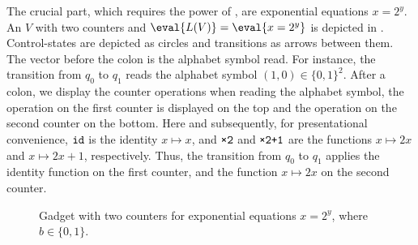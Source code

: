 The crucial part, which requires the power of \laVASS, are exponential
equations $x=2^y$. An \laVASS $V$ with two counters and
$\eval{L(V)}=\eval{x=2^y}$ is depicted
in . Control-states are depicted as
circles and transitions as arrows between them. The vector before the
colon is the alphabet symbol read. For instance, the transition from
$q_0$ to $q_1$ reads the alphabet symbol $(1,0)\in \{0,1\}^2$. After a
colon, we display the counter operations when reading the alphabet
symbol, the operation on the first counter is displayed on the top and
the operation on the second counter on the bottom. Here and
subsequently, for presentational convenience, ${\normalfont{\texttt{{id}}}}$ is the identity
$x\mapsto x$, and $\wTT$ and $\wTTPO$ are the functions $x \mapsto 2
x$ and $x \mapsto 2 x + 1$, respectively.  Thus, the transition from
$q_0$ to $q_1$ applies the identity function on the first counter, and
the function $x\mapsto 2x$ on the second counter.
%
\begin{figure}[!t]
\centering
{}
  \caption{Gadget with two counters for exponential equations $x=2^y$,
  where $b\in\{0,1\}$.}  \label{fig:exponential-gadget}
\end{figure}

